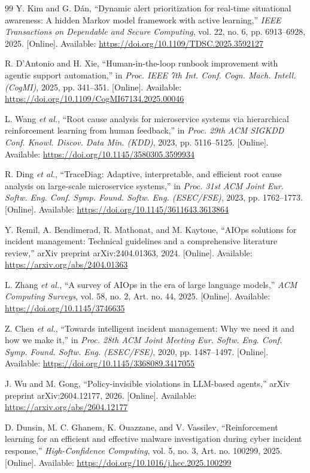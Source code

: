 \documentclass[12pt,a4paper]{article}
\begin{document}
\begin{thebibliography}{99}
 Y. Kim and G. D\'{a}n, ``Dynamic alert prioritization for real-time situational awareness: A hidden Markov model framework with active learning,'' \emph{IEEE Transactions on Dependable and Secure Computing}, vol. 22, no. 6, pp. 6913--6928, 2025. [Online]. Available: \url{https://doi.org/10.1109/TDSC.2025.3592127}

 R. D'Antonio and H. Xie, ``Human-in-the-loop runbook improvement with agentic support automation,'' in \emph{Proc. IEEE 7th Int. Conf. Cogn. Mach. Intell. (CogMI)}, 2025, pp. 341--351. [Online]. Available: \url{https://doi.org/10.1109/CogMI67134.2025.00046}

 L. Wang \emph{et al.}, ``Root cause analysis for microservice systems via hierarchical reinforcement learning from human feedback,'' in \emph{Proc. 29th ACM SIGKDD Conf. Knowl. Discov. Data Min. (KDD)}, 2023, pp. 5116--5125. [Online]. Available: \url{https://doi.org/10.1145/3580305.3599934}

 R. Ding \emph{et al.}, ``TraceDiag: Adaptive, interpretable, and efficient root cause analysis on large-scale microservice systems,'' in \emph{Proc. 31st ACM Joint Eur. Softw. Eng. Conf. Symp. Found. Softw. Eng. (ESEC/FSE)}, 2023, pp. 1762--1773. [Online]. Available: \url{https://doi.org/10.1145/3611643.3613864}

 Y. Remil, A. Bendimerad, R. Mathonat, and M. Kaytoue, ``AIOps solutions for incident management: Technical guidelines and a comprehensive literature review,'' arXiv preprint arXiv:2404.01363, 2024. [Online]. Available: \url{https://arxiv.org/abs/2404.01363}

 L. Zhang \emph{et al.}, ``A survey of AIOps in the era of large language models,'' \emph{ACM Computing Surveys}, vol. 58, no. 2, Art. no. 44, 2025. [Online]. Available: \url{https://doi.org/10.1145/3746635}

 Z. Chen \emph{et al.}, ``Towards intelligent incident management: Why we need it and how we make it,'' in \emph{Proc. 28th ACM Joint Meeting Eur. Softw. Eng. Conf. Symp. Found. Softw. Eng. (ESEC/FSE)}, 2020, pp. 1487--1497. [Online]. Available: \url{https://doi.org/10.1145/3368089.3417055}

 J. Wu and M. Gong, ``Policy-invisible violations in LLM-based agents,'' arXiv preprint arXiv:2604.12177, 2026. [Online]. Available: \url{https://arxiv.org/abs/2604.12177}

 D. Dunsin, M. C. Ghanem, K. Ouazzane, and V. Vassilev, ``Reinforcement learning for an efficient and effective malware investigation during cyber incident response,'' \emph{High-Confidence Computing}, vol. 5, no. 3, Art. no. 100299, 2025. [Online]. Available: \url{https://doi.org/10.1016/j.hcc.2025.100299}


\end{thebibliography}
\end{document}
